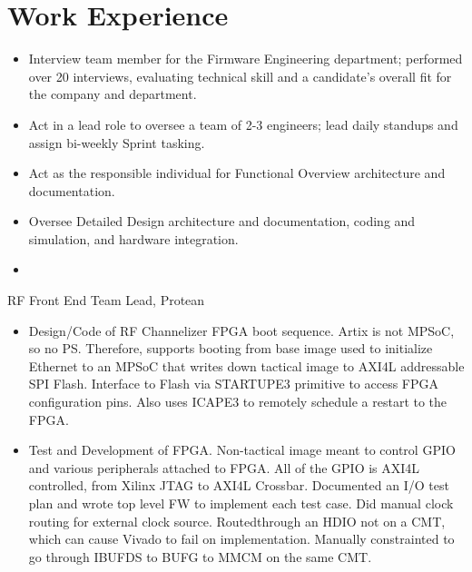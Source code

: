 \documentclass[10pt,final,sans]{resume}
\begin{document}
\section{Work Experience}
\begin{itemize}
  \item Interview team member for the Firmware Engineering department; performed over 20 interviews, evaluating technical skill and a candidate's overall fit for the company and department. 
  \item Act in a lead role to oversee a team of 2-3 engineers; lead daily standups and assign bi-weekly Sprint tasking. 
  \item Act as the responsible individual for Functional Overview architecture and documentation.
  \item Oversee Detailed Design architecture and documentation, coding and simulation, and hardware integration. 
  \item 
\end{itemize} 

RF Front End Team Lead, Protean
\begin{itemize}
  \item Design/Code of RF Channelizer FPGA boot sequence. Artix is not MPSoC, so no PS. Therefore, supports booting from base image used to initialize Ethernet to an MPSoC that writes down tactical image to AXI4L addressable SPI Flash. Interface to Flash via STARTUPE3 primitive to access FPGA configuration pins. Also uses ICAPE3 to remotely schedule a restart to the FPGA. 
  \item Test and Development of FPGA. Non-tactical image meant to control GPIO and various peripherals attached to FPGA. All of the GPIO is AXI4L controlled, from Xilinx JTAG to AXI4L Crossbar. Documented an I/O test plan and wrote top level FW to implement each test case. Did manual clock routing for external clock source. Routedthrough an HDIO not on a CMT, which can cause Vivado to fail on implementation. Manually constrainted to go through IBUFDS to BUFG to MMCM on the same CMT.
\end{itemize}
\end{document}
